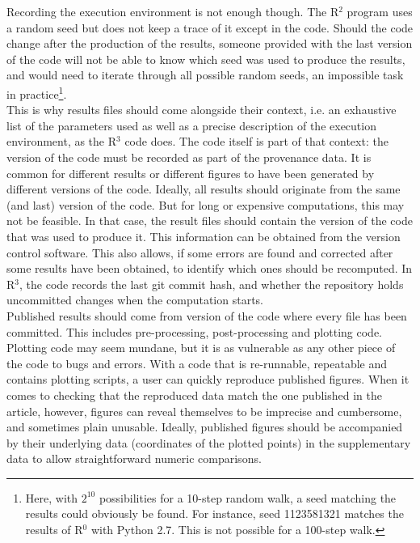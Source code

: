 \documentclass[a4paper,11pt]{article}
\begin{document}
Recording the execution environment is not enough though. The R$^2$ program uses a random seed but does not keep a trace of it except in the code. Should the code change after the production of the results, someone provided with the last version of the code will not be able to know which seed was used to produce the results, and would need to iterate through all possible random seeds, an impossible task in practice\footnote{Here, with $2^{10}$ possibilities for a 10-step random walk, a seed matching the results could obviously be found. For instance, seed 1123581321 matches the results of R$^0$ with Python 2.7. This is not possible for a 100-step walk.}.\\

This is why results files should come alongside their context, i.e. an exhaustive list of the parameters used as well as a precise description of the execution environment, as the R$^3$ code does. The code itself is part of that context: the version of the code must be recorded as part of the provenance data. It is common for different results or different figures to have been generated by different versions of the code. Ideally, all results should originate from the same (and last) version of the code. But for long or expensive computations, this may not be feasible. In that case, the result files should contain the version of the code that was used to produce it. This information can be obtained from the version control software. This also allows, if some errors are found and corrected after some results have been obtained, to identify which ones should be recomputed. In R$^3$, the code records the last git commit hash, and whether the repository holds uncommitted changes when the computation starts.\\

Published results should come from version of the code where every file has been committed. This includes pre-processing, post-processing and plotting code. Plotting code may seem mundane, but it is as vulnerable as any other piece of the code to bugs and errors. With a code that is re-runnable, repeatable and contains plotting scripts, a user can quickly reproduce published figures. When it comes to checking that the reproduced data match the one published in the article, however, figures can reveal themselves to be imprecise and cumbersome, and sometimes plain unusable. Ideally, published figures should be accompanied by their underlying data (coordinates of the plotted points) in the supplementary data to allow straightforward numeric comparisons.\\
\end{document}
